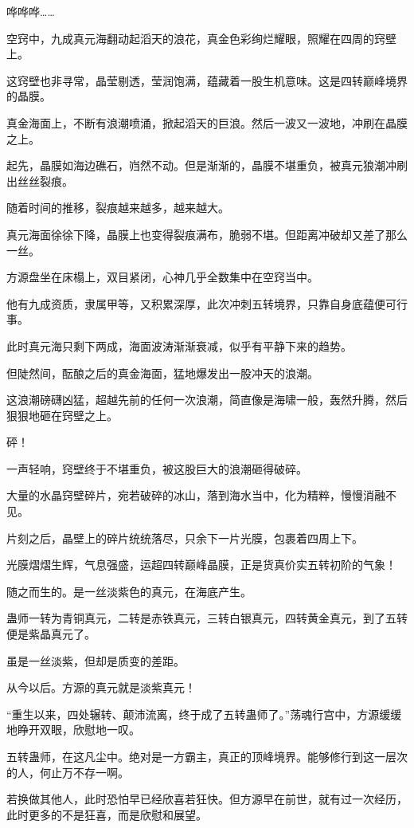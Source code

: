 
\begin{this_body}

哗哗哗……

空窍中，九成真元海翻动起滔天的浪花，真金色彩绚烂耀眼，照耀在四周的窍壁上。

这窍壁也非寻常，晶莹剔透，莹润饱满，蕴藏着一股生机意味。这是四转巅峰境界的晶膜。

真金海面上，不断有浪潮喷涌，掀起滔天的巨浪。然后一波又一波地，冲刷在晶膜之上。

起先，晶膜如海边礁石，岿然不动。但是渐渐的，晶膜不堪重负，被真元狼潮冲刷出丝丝裂痕。

随着时间的推移，裂痕越来越多，越来越大。

真元海面徐徐下降，晶膜上也变得裂痕满布，脆弱不堪。但距离冲破却又差了那么一丝。

方源盘坐在床榻上，双目紧闭，心神几乎全数集中在空窍当中。

他有九成资质，隶属甲等，又积累深厚，此次冲刺五转境界，只靠自身底蕴便可行事。

此时真元海只剩下两成，海面波涛渐渐衰减，似乎有平静下来的趋势。

但陡然间，酝酿之后的真金海面，猛地爆发出一股冲天的浪潮。

这浪潮磅礴凶猛，超越先前的任何一次浪潮，简直像是海啸一般，轰然升腾，然后狠狠地砸在窍壁之上。

砰！

一声轻响，窍壁终于不堪重负，被这股巨大的浪潮砸得破碎。

大量的水晶窍壁碎片，宛若破碎的冰山，落到海水当中，化为精粹，慢慢消融不见。

片刻之后，晶壁上的碎片统统落尽，只余下一片光膜，包裹着四周上下。

光膜熠熠生辉，气息强盛，运超四转巅峰晶膜，正是货真价实五转初阶的气象！

随之而生的。是一丝淡紫色的真元，在海底产生。

蛊师一转为青铜真元，二转是赤铁真元，三转白银真元，四转黄金真元，到了五转便是紫晶真元了。

虽是一丝淡紫，但却是质变的差距。

从今以后。方源的真元就是淡紫真元！

“重生以来，四处辗转、颠沛流离，终于成了五转蛊师了。”荡魂行宫中，方源缓缓地睁开双眼，欣慰地一叹。

五转蛊师，在这凡尘中。绝对是一方霸主，真正的顶峰境界。能够修行到这一层次的人，何止万不存一啊。

若换做其他人，此时恐怕早已经欣喜若狂快。但方源早在前世，就有过一次经历，此时更多的不是狂喜，而是欣慰和展望。


\end{this_body}
